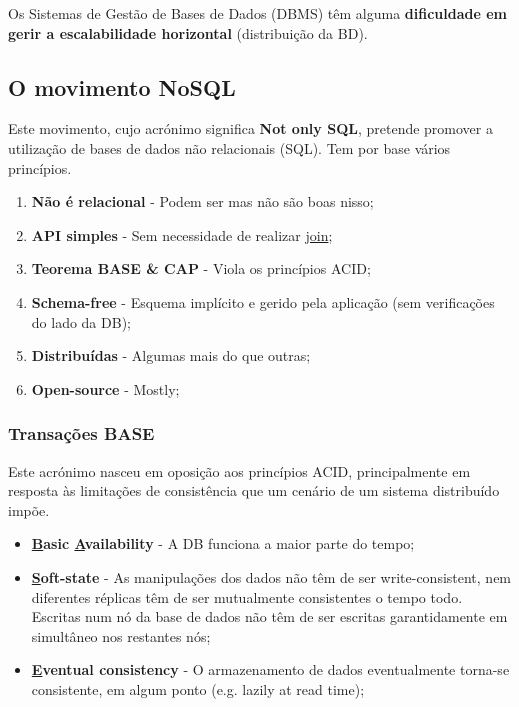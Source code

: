 \documentclass{article}
\begin{document}
Os Sistemas de Gestão de Bases de Dados (DBMS) têm alguma \textbf{dificuldade em gerir a escalabilidade
horizontal} (distribuição da BD).

\subsection{O movimento NoSQL}

Este movimento, cujo acrónimo significa
\textbf{Not only SQL}, pretende promover a utilização de bases
de dados não relacionais (SQL). Tem por base vários princípios.

\begin{enumerate}
  \item \textbf{Não é relacional} - Podem ser mas não são boas nisso;
  \item \textbf{API simples} - Sem necessidade de realizar \uline{join};
  \item \textbf{Teorema BASE \& CAP} - Viola os princípios ACID;
  \item \textbf{Schema-free} - Esquema implícito e gerido pela aplicação (sem verificações do lado da DB);
  \item \textbf{Distribuídas} - Algumas mais do que outras;
  \item \textbf{Open-source} - Mostly;
\end{enumerate}

\subsubsection{Transações BASE}

Este acrónimo nasceu em oposição aos princípios ACID, principalmente
em resposta às limitações de consistência que um cenário de um sistema
distribuído impõe.

\begin{itemize}
  \item \textbf{\uline{B}asic \uline{A}vailability} - A DB funciona a maior parte do tempo;
  \item \textbf{\uline{S}oft-state} - As manipulações dos dados não têm de ser write-consistent, nem
  diferentes réplicas têm de ser mutualmente consistentes o tempo todo.
  Escritas num nó da base de dados não têm de ser escritas garantidamente em simultâneo nos restantes nós;
  \item \textbf{\uline{E}ventual consistency} - O armazenamento de dados eventualmente torna-se consistente, em algum ponto
  (e.g. lazily at read time);
\end{itemize}
\end{document}
